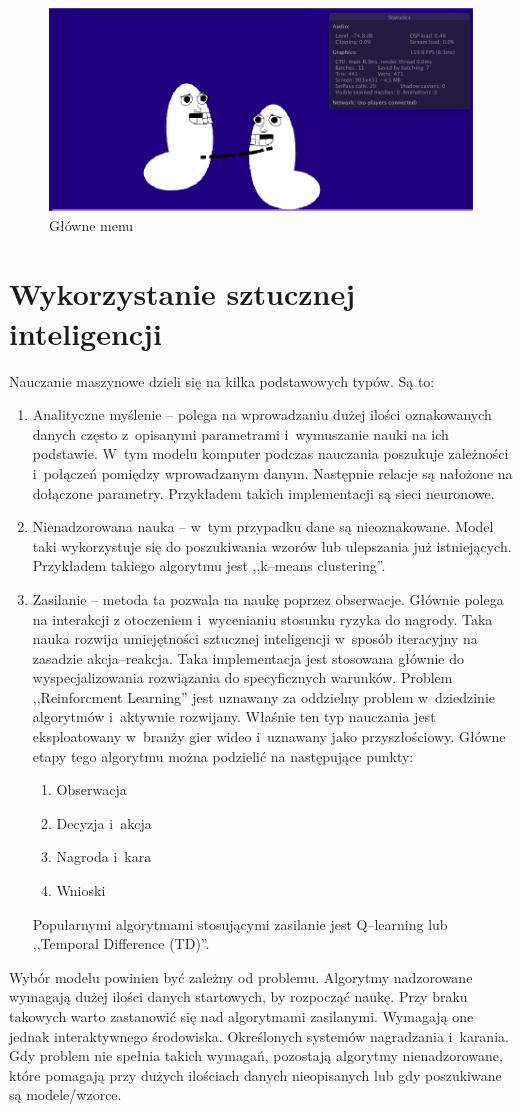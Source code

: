 \documentclass[brudnopis]{xmgr}
\begin{document}
\begin{figure}[!tbh]
\centering
\includegraphics[width=0.7\hsize]{fig/attack}
\caption{Główne menu\label{RYS.2}}
\end{figure}

\section{Wykorzystanie sztucznej inteligencji}
Nauczanie maszynowe dzieli się na kilka podstawowych typów. Są to:
\begin{enumerate}
\item Analityczne myślenie -- polega na wprowadzaniu dużej ilości oznakowanych
danych często z~opisanymi
parametrami i~wymuszanie nauki na ich podstawie. W~tym modelu komputer
podczas nauczania
poszukuje zależności i~połączeń pomiędzy wprowadzanym danym. Następnie
relacje są nałożone na
dołączone parametry. Przykładem takich implementacji są sieci
neuronowe.
\item Nienadzorowana nauka -- w~tym przypadku dane są nieoznakowane. Model taki wykorzystuje się do poszukiwania wzorów lub ulepszania już istniejących. 
Przykładem takiego algorytmu jest ,,k--means clustering''.
\item Zasilanie -- metoda ta pozwala na naukę poprzez obserwacje. Głównie
polega na interakcji z
otoczeniem i~wycenianiu stosunku ryzyka do nagrody. Taka nauka rozwija
umiejętności sztucznej
inteligencji w~sposób iteracyjny na zasadzie akcja--reakcja. Taka
implementacja jest stosowana głównie
do wyspecjalizowania rozwiązania do specyficznych warunków. Problem
 ,,Reinforcment Learning'' jest
uznawany za oddzielny problem w~dziedzinie algorytmów i~aktywnie
rozwijany. Właśnie ten typ
nauczania jest eksploatowany w~branży gier wideo i~uznawany jako
przyszłościowy. Główne etapy tego
algorytmu można podzielić na następujące punkty:
\begin{enumerate}
\item Obserwacja
\item Decyzja i~akcja
\item Nagroda i~kara
\item Wnioski
\end{enumerate}
Popularnymi algorytmami stosującymi zasilanie jest Q--learning lub
 ,,Temporal Difference (TD)''.
\end{enumerate}
Wybór modelu powinien być zależny od problemu. Algorytmy nadzorowane
wymagają dużej ilości
danych startowych, by rozpocząć naukę. Przy braku takowych warto
zastanowić się nad algorytmami
zasilanymi. Wymagają one jednak interaktywnego środowiska. Określonych
systemów nagradzania i~karania. Gdy problem nie spełnia takich wymagań, pozostają algorytmy
nienadzorowane, które pomagają
przy dużych ilościach danych nieopisanych lub gdy poszukiwane są
modele/wzorce.
\end{document}
